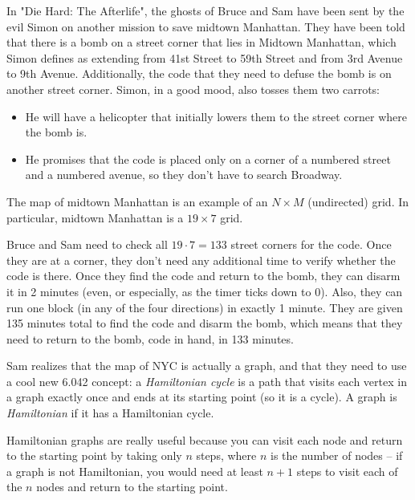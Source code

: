 \documentclass[twoside,12pt]{article}
\begin{document}
\begin{problem}{15}

In "Die Hard: The Afterlife", the ghosts of Bruce and Sam have been
sent by the evil Simon on another mission to save  midtown
Manhattan. They have been told that there is a bomb on a street
corner that lies in Midtown Manhattan, which Simon defines as
extending from 41st Street to 59th Street and from 3rd Avenue to 9th
Avenue. Additionally, the code that they need to defuse the bomb is
on another street corner. Simon, in a good mood, also tosses them
two carrots:

\begin{itemize}
\item He will have a helicopter that initially lowers them to the street corner where the bomb is.
\item He promises that the code is placed only on a corner of a numbered
street and a numbered avenue, so they don't have to search Broadway.
\end{itemize}

The map of midtown Manhattan is an example of an $N \times M$
(undirected) grid.  In particular, midtown Manhattan is a $19 \times
7$ grid.


Bruce and Sam need to check all $19 \cdot 7 = 133$ street corners
for the code.  Once they are at a corner, they don't need any
additional time to verify whether the code is there.  Once they find the
code and return to the bomb, they can disarm it in 2 minutes (even,
or especially, as the timer ticks down to 0). Also, they can run one
block (in any of the four directions) in exactly 1 minute.
They are given 135 minutes total to find the code and
disarm the bomb, which means that they need to return to the bomb,
code in hand, in 133 minutes.

Sam realizes that the map of NYC is actually a graph, and that they
need to use a cool new 6.042 concept: a {\em Hamiltonian cycle} is a
path that visits each vertex in a graph exactly once and ends at its
starting point (so it is a cycle). A graph is {\em Hamiltonian} if
it has a Hamiltonian cycle.

Hamiltonian graphs are really useful because you can visit each node
and return to the starting point by taking only $n$ steps, where $n$
is the number of nodes -- if a graph is not Hamiltonian, you would
need at least $n+1$ steps to visit each of the $n$ nodes and return
to the starting point.


\end{problem}
\end{document}
